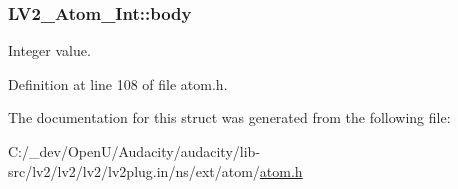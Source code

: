\subsubsection[{\texorpdfstring{body}{body}}]{ L\+V2\+\_\+\+Atom\+\_\+\+Int\+::body}\hypertarget{struct_l_v2___atom___int_a7827960af4d61b2a758d5af28eaf51fc}{}\label{struct_l_v2___atom___int_a7827960af4d61b2a758d5af28eaf51fc}
Integer value. 

Definition at line 108 of file atom.\+h.



The documentation for this struct was generated from the following file\+:\begin{DoxyCompactItemize}
\item 
C\+:/\+\_\+dev/\+Open\+U/\+Audacity/audacity/lib-\/src/lv2/lv2/lv2/lv2plug.\+in/ns/ext/atom/\hyperlink{atom_8h}{atom.\+h}\end{DoxyCompactItemize}
